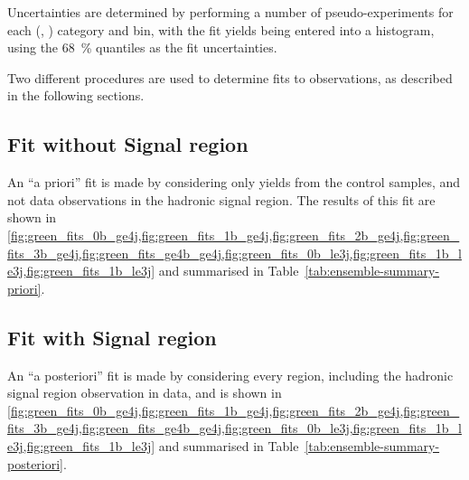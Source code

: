 Uncertainties are determined by performing a number of pseudo-experiments for
each (\nb, \nj) category and \HT bin, with the fit yields being entered into a
histogram, using the 68~\% quantiles as the fit uncertainties.

Two different procedures are used to determine fits to observations, as described
in the following sections.

\subsection{Fit without Signal region}
\label{sec:results_fit_green}
An ``a priori'' fit is made by considering only yields from the control samples,
and not data observations in the hadronic signal region. The results of this fit
are shown in \cref{fig:green_fits_0b_ge4j,fig:green_fits_1b_ge4j,fig:green_fits_2b_ge4j,fig:green_fits_3b_ge4j,fig:green_fits_ge4b_ge4j,fig:green_fits_0b_le3j,fig:green_fits_1b_le3j,fig:green_fits_1b_le3j}
and summarised in Table~\ref{tab:ensemble-summary-priori}.


\subsection{Fit with Signal region}
An ``a posteriori'' fit is made by considering every region, including the
hadronic signal region observation in data, and is shown in
\cref{fig:green_fits_0b_ge4j,fig:green_fits_1b_ge4j,fig:green_fits_2b_ge4j,fig:green_fits_3b_ge4j,fig:green_fits_ge4b_ge4j,fig:green_fits_0b_le3j,fig:green_fits_1b_le3j,fig:green_fits_1b_le3j}
and summarised in Table~\ref{tab:ensemble-summary-posteriori}.

